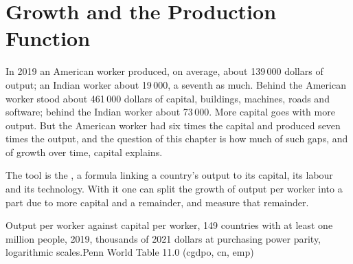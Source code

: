 \chapter{Growth and the Production Function}\label{ch:g12:growth-and-production-function}

In 2019 an American worker produced, on average, about 139\,000 dollars of output; an Indian worker about 19\,000, a seventh as much. Behind the American worker stood
about 461\,000 dollars of capital, buildings, machines, roads and software; behind the Indian worker about 73\,000. More capital goes with more output. But the
American worker had six times the capital and produced seven times the output, and the question of this chapter is how much of such gaps, and of growth over time, capital
explains.

The tool is the , a formula linking a country's output to its capital, its labour and its technology. With it one can split the growth of
output per worker into a part due to more capital and a remainder, and measure that remainder.

\begin{openingchart}{Output per worker against capital per worker, 149 countries with at least one million people, 2019, thousands of 2021 dollars at purchasing power
parity, logarithmic scales.}{Penn World Table 11.0 (cgdpo, cn, emp)}
\end{openingchart}

